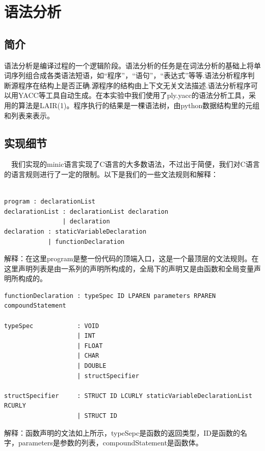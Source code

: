 \documentclass{article}
\begin{document}
\section{语法分析}

\subsection{简介}

语法分析是编译过程的一个逻辑阶段。语法分析的任务是在词法分析的基础上将单词序列组合成各类语法短语，如“程序”，“语句”，“表达式”等等.语法分析程序判断源程序在结构上是否正确.源程序的结构由上下文无关文法描述.语法分析程序可以用YACC等工具自动生成。在本实验中我们使用了ply.yacc的语法分析工具，采用的算法是LAIR(1)。程序执行的结果是一棵语法树，由python数据结构里的元组和列表来表示。

\subsection{实现细节}

\quad \ \ 我们实现的minic语言实现了C语言的大多数语法，不过出于简便，我们对C语言的语言规则进行了一定的限制。以下是我们的一些文法规则和解释：
\begin{verbatim}

program : declarationList
declarationList : declarationList declaration
                | declaration
declaration : staticVariableDeclaration
            | functionDeclaration

\end{verbatim}

解释：在这里program是整一份代码的顶端入口，这是一个最顶层的文法规则。在这里声明列表是由一系列的声明所构成的，全局下的声明又是由函数和全局变量声明所构成的。

\begin{verbatim}
functionDeclaration : typeSpec ID LPAREN parameters RPAREN compoundStatement

typeSpec            : VOID
                    | INT
                    | FLOAT
                    | CHAR
                    | DOUBLE
                    | structSpecifier
                              
structSpecifier     : STRUCT ID LCURLY staticVariableDeclarationList RCURLY
                    | STRUCT ID
\end{verbatim}

解释：函数声明的文法如上所示，typeSepc是函数的返回类型，ID是函数的名字，parameters是参数的列表，compoundStatement是函数体。
\end{document}
